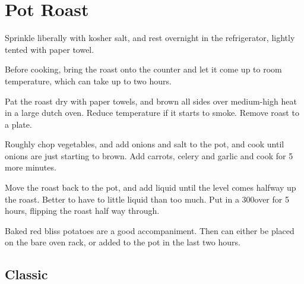 

\section{Pot Roast}
\begin{recipe}



Sprinkle liberally with kosher salt, and rest overnight in the refrigerator, lightly tented with paper towel.

Before cooking, bring the roast onto the counter and let it come up to room temperature, which can take up to two hours.

Pat the roast dry with paper towels, and brown all sides over medium-high heat in a large dutch oven. Reduce temperature if it starts to smoke. Remove roast to a plate.


Roughly chop vegetables, and add onions and salt to the pot, and cook until onions are just starting to brown. Add carrots, celery and garlic and cook for 5 more minutes.

Move the roast back to the pot, and add liquid until the level comes halfway up the roast. Better to have to little liquid than too much. Put in a 300\degree over for 5 hours, flipping the roast half way through.

Baked red bliss potatoes are a good accompaniment. Then can either be placed on the bare oven rack, or added to the pot in the last two hours.

\subsection{Classic}




\end{recipe}
